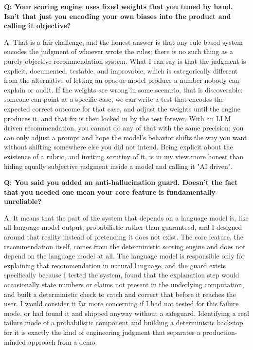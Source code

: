 \documentclass[11pt,a4paper]{report}
\begin{document}
\begin{qabox}
\textbf{Q: Your scoring engine uses fixed weights that you tuned by hand. Isn't that just you encoding your own biases into the product and calling it objective?}

A: That is a fair challenge, and the honest answer is that any rule based system encodes the judgment of whoever wrote the rules; there is no such thing as a purely objective recommendation system. What I can say is that the judgment is explicit, documented, testable, and improvable, which is categorically different from the alternative of letting an opaque model produce a number nobody can explain or audit. If the weights are wrong in some scenario, that is discoverable: someone can point at a specific case, we can write a test that encodes the expected correct outcome for that case, and adjust the weights until the engine produces it, and that fix is then locked in by the test forever. With an LLM driven recommendation, you cannot do any of that with the same precision; you can only adjust a prompt and hope the model's behavior shifts the way you want without shifting somewhere else you did not intend. Being explicit about the existence of a rubric, and inviting scrutiny of it, is in my view more honest than hiding equally subjective judgment inside a model and calling it "AI driven".
\end{qabox}

\begin{qabox}
\textbf{Q: You said you added an anti-hallucination guard. Doesn't the fact that you needed one mean your core feature is fundamentally unreliable?}

A: It means that the part of the system that depends on a language model is, like all language model output, probabilistic rather than guaranteed, and I designed around that reality instead of pretending it does not exist. The core feature, the recommendation itself, comes from the deterministic scoring engine and does not depend on the language model at all. The language model is responsible only for explaining that recommendation in natural language, and the guard exists specifically because I tested the system, found that the explanation step would occasionally state numbers or claims not present in the underlying computation, and built a deterministic check to catch and correct that before it reaches the user. I would consider it far more concerning if I had not tested for this failure mode, or had found it and shipped anyway without a safeguard. Identifying a real failure mode of a probabilistic component and building a deterministic backstop for it is exactly the kind of engineering judgment that separates a production-minded approach from a demo.
\end{qabox}
\end{document}
